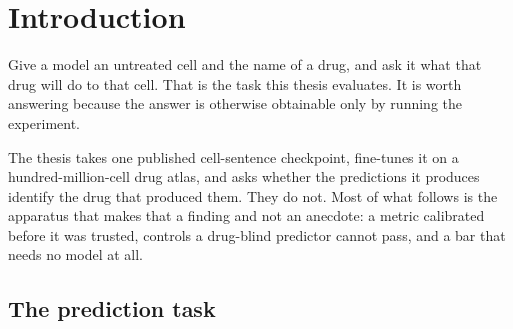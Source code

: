 %
%
%

\chapter{Introduction}
\label{sec:introduction}

\noindent
Give a model an untreated cell and the name of a drug, and ask it what that
drug will do to that cell. That is the task this thesis evaluates. It is worth
answering because the answer is otherwise obtainable only by running the
experiment.

The thesis takes one published cell-sentence checkpoint, fine-tunes it on a
hundred-million-cell drug atlas, and asks whether the predictions it produces
identify the drug that produced them. They do not. Most of what follows is the
apparatus that makes that a finding and not an anecdote: a metric calibrated
before it was trusted, controls a drug-blind predictor cannot pass, and a bar
that needs no model at all.

\section{The prediction task}
\label{sec:intro-task}

